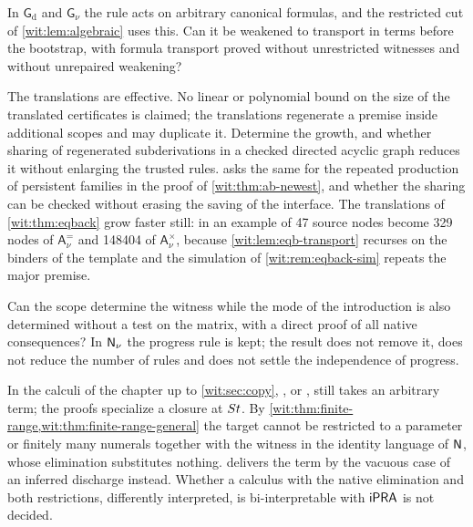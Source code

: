\begin{question}
In $\mathsf{G}_{\mathrm d}$ and $\mathsf{G}_{\nu}$ the rule 
acts on arbitrary canonical formulas, and the restricted cut of
\cref{wit:lem:algebraic} uses this.  Can it be weakened to transport in
terms before the bootstrap, with formula transport proved without
unrestricted witnesses and without unrepaired weakening?
\end{question}

\begin{question}
The translations are effective.  No linear or polynomial bound on the size
of the translated certificates is claimed; the translations regenerate a
premise inside additional scopes and may duplicate it.  Determine the
growth, and whether sharing of regenerated subderivations in a checked
directed acyclic graph reduces it without enlarging the trusted rules.
 asks the same for the repeated production of
persistent families in the proof of \cref{wit:thm:ab-newest}, and whether
the sharing can be checked without erasing the saving of the interface.
The translations of \cref{wit:thm:eqback} grow faster still: in an example
of  47 source nodes become 329 nodes of
$\mathsf{A}^{=}_{\nu}$ and 148404 of $\mathsf{A}^{\times}_{\nu}$, because
\cref{wit:lem:eqb-transport} recurses on the binders of the template and the
simulation of \cref{wit:rem:eqback-sim} repeats the major premise.
\end{question}

\begin{question}
Can the scope determine the witness while the mode of the introduction is
also determined without a test on the matrix, with a direct proof of all
native consequences?  In $\mathsf{N}_{\nu}$ the progress rule  is
kept; the result does not remove it, does not reduce the number of rules
and does not settle the independence of progress.
\end{question}

\begin{question}
In the calculi of the chapter up to \cref{wit:sec:copy}, , or
, still takes an arbitrary term; the proofs specialize a
closure at $S t$.  By
\cref{wit:thm:finite-range,wit:thm:finite-range-general} the target cannot
be restricted to a parameter or finitely many numerals together with the
witness in the identity language of $\mathsf{N}$, whose elimination substitutes
nothing.   delivers the term by the vacuous case of an
inferred discharge instead.  Whether a calculus with the native elimination
 and both restrictions, differently interpreted, is
bi-interpretable with $\mathsf{iPRA}$ is not decided.
\end{question}

